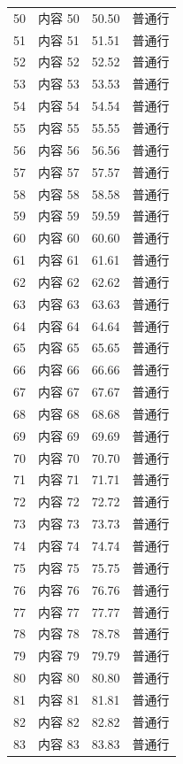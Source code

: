 {\begin{longtable}{!{\vrule width 1pt}c|c|r|p{25mm}!{\vrule width 1pt}}
    50 & 内容 50 & 50.50 & 普通行 \\
    51 & 内容 51 & 51.51 & 普通行 \\
    52 & 内容 52 & 52.52 & 普通行 \\
    53 & 内容 53 & 53.53 & 普通行 \\
    54 & 内容 54 & 54.54 & 普通行 \\
    55 & 内容 55 & 55.55 & 普通行 \\
    56 & 内容 56 & 56.56 & 普通行 \\
    57 & 内容 57 & 57.57 & 普通行 \\
    58 & 内容 58 & 58.58 & 普通行 \\
    59 & 内容 59 & 59.59 & 普通行 \\
    60 & 内容 60 & 60.60 & 普通行 \\
    61 & 内容 61 & 61.61 & 普通行 \\
    62 & 内容 62 & 62.62 & 普通行 \\
    63 & 内容 63 & 63.63 & 普通行 \\
    64 & 内容 64 & 64.64 & 普通行 \\
    65 & 内容 65 & 65.65 & 普通行 \\
    66 & 内容 66 & 66.66 & 普通行 \\
    67 & 内容 67 & 67.67 & 普通行 \\
    68 & 内容 68 & 68.68 & 普通行 \\
    69 & 内容 69 & 69.69 & 普通行 \\
    70 & 内容 70 & 70.70 & 普通行 \\
    71 & 内容 71 & 71.71 & 普通行 \\
    72 & 内容 72 & 72.72 & 普通行 \\
    73 & 内容 73 & 73.73 & 普通行 \\
    74 & 内容 74 & 74.74 & 普通行 \\
    75 & 内容 75 & 75.75 & 普通行 \\
    76 & 内容 76 & 76.76 & 普通行 \\
    77 & 内容 77 & 77.77 & 普通行 \\
    78 & 内容 78 & 78.78 & 普通行 \\
    79 & 内容 79 & 79.79 & 普通行 \\
    80 & 内容 80 & 80.80 & 普通行 \\
    81 & 内容 81 & 81.81 & 普通行 \\
    82 & 内容 82 & 82.82 & 普通行 \\
    83 & 内容 83 & 83.83 & 普通行 \\

\end{longtable}}

